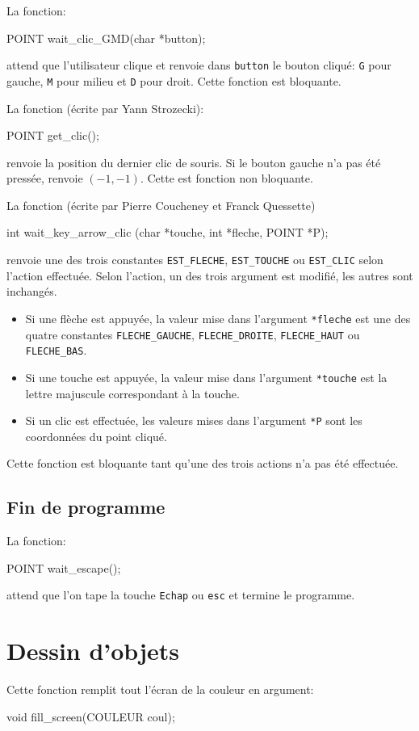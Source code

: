 \documentclass{report}
\newcommand\code[1]{
\begin{mdframed}[linecolor=purple,backgroundcolor=blue!10]
{\tt
#1
}
\end{mdframed}
}
\begin{document}
La fonction:
\code{
POINT wait\_clic\_GMD(char *button);
}
attend que l'utilisateur clique  et renvoie dans \texttt{button} le bouton cliqué:
\texttt{G} pour gauche, \texttt{M} pour milieu et \texttt{D} pour droit.
Cette fonction est bloquante.

La fonction (écrite par Yann Strozecki):
\code{
POINT get\_clic();
}
renvoie la position du dernier clic de souris.
Si le bouton gauche n'a pas été pressée, renvoie $(-1,-1)$.
Cette est fonction non bloquante.

La fonction (écrite par Pierre Coucheney et Franck Quessette)
\code{
int wait\_key\_arrow\_clic (char *touche, int *fleche, POINT *P);
}
renvoie une des trois constantes \texttt{EST\_FLECHE}, \texttt{EST\_TOUCHE} ou \texttt{EST\_CLIC} selon l'action effectuée.
Selon l'action, un des trois argument est modifié, les autres sont inchangés.
\begin{itemize}
\item Si une flèche est appuyée, la valeur mise dans l'argument \texttt{*fleche} est une des quatre constantes \texttt{FLECHE\_GAUCHE},
\texttt{FLECHE\_DROITE}, \texttt{FLECHE\_HAUT} ou \texttt{FLECHE\_BAS}.
\item Si une touche est appuyée, la valeur mise dans l'argument \texttt{*touche} est la lettre majuscule correspondant à la touche.
\item Si un clic est effectuée, les valeurs mises dans l'argument \texttt{*P} sont les coordonnées du point cliqué.
\end{itemize}
Cette fonction est bloquante tant qu'une des trois actions n'a pas été effectuée.

\subsection{Fin de programme}

La fonction:
\code{
POINT wait\_escape();
}
attend que l'on tape la touche \texttt{Echap} ou \texttt{esc} et termine le programme.

\section{Dessin d'objets}
Cette fonction remplit tout l'écran de la couleur en argument:
\code{
void fill\_screen(COULEUR coul);
}
\end{document}
